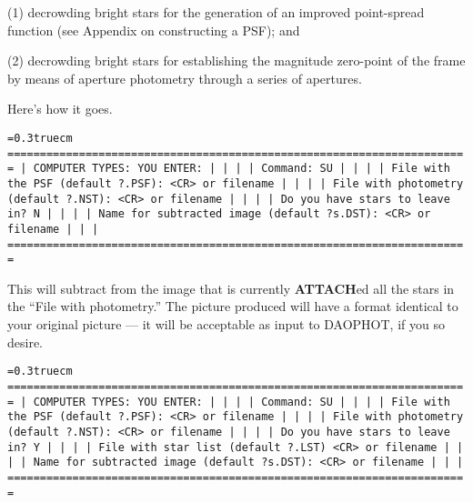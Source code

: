 \item{(1)} decrowding bright stars for the generation of an improved
point-spread function (see Appendix on constructing a PSF); and

\item{(2)} decrowding bright stars for establishing the magnitude
zero-point of the frame by means of aperture photometry through a
series of apertures.

Here's how it goes.

\bigskip
{\noindent\obeylines\obeyspaces\frenchspacing\tt\baselineskip=0.3truecm
=======================================================================
| COMPUTER TYPES:                                  YOU ENTER:         |
|                                                                     |
| Command:                                         SU                 |
|                                                                     |
|             File with the PSF (default ?.PSF):   <CR> or filename   |
|                                                                     |
|          File with photometry (default ?.NST):   <CR> or filename   |
|                                                                     |
|                Do you have stars to leave in?    N                  |
|                                                                     |
|    Name for subtracted image (default ?s.DST):   <CR> or filename   |
|                                                                     |
=======================================================================
}
\bigskip

\noindent This will subtract from the image that is currently {\bf
ATTACH}ed all the stars in the ``File with photometry.''  The picture
produced will have a format identical to your original picture --- it
will be acceptable as input to DAOPHOT, if you so desire.

\vfill
\eject
{\noindent\obeylines\obeyspaces\frenchspacing\tt\baselineskip=0.3truecm
=======================================================================
| COMPUTER TYPES:                                  YOU ENTER:         |
|                                                                     |
| Command:                                         SU                 |
|                                                                     |
|             File with the PSF (default ?.PSF):   <CR> or filename   |
|                                                                     |
|          File with photometry (default ?.NST):   <CR> or filename   |
|                                                                     |
|                Do you have stars to leave in?    Y                  |
|                                                                     |
|           File with star list (default ?.LST)    <CR> or filename   |
|                                                                     |
|    Name for subtracted image (default ?s.DST):   <CR> or filename   |
|                                                                     |
=======================================================================
}
\bigskip

